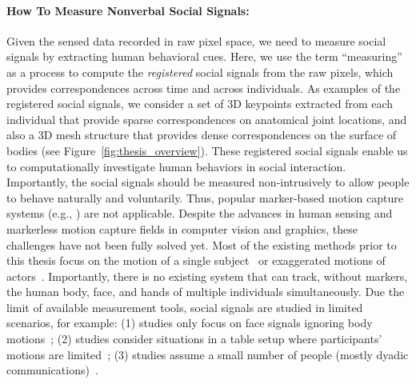 \paragraph{How To Measure Nonverbal Social Signals:}
Given the sensed data recorded in raw pixel space, we need to measure social signals by extracting human behavioral cues. Here, we use the term ``measuring'' as a process to compute the \emph{registered} social signals from the raw pixels, which provides correspondences across time and across individuals. As examples of the registered social signals, we consider a set of 3D keypoints extracted from each individual that provide sparse correspondences on anatomical joint locations, and also a 3D mesh structure that provides dense correspondences on the surface of bodies (see Figure~\ref{fig:thesis_overview}). These registered social signals enable us to computationally investigate human behaviors in social interaction. Importantly, the social signals should be measured non-intrusively to allow people to behave naturally and voluntarily. Thus, popular marker-based motion capture systems (e.g., \cite{VICON}) are not applicable. Despite the advances in human sensing and markerless motion capture fields in computer vision and graphics, these challenges have not been fully solved yet. Most of the existing methods prior to this thesis focus on the motion of a single subject~\cite{de2008performance,Vlasic-2009,Furukawa-2008,Gall-09, Stoll-11, Baak2011,Shotton-13} or exaggerated motions of actors~\cite{Ye-2012,Liu-2013}. Importantly, there is no existing system that can track, without markers, the human body, face, and hands of multiple individuals simultaneously. Due the limit of available measurement tools, social signals are studied in limited scenarios, for example: (1) studies only focus on face signals ignoring body motions~\cite{messinger2009automated, lucas_trust_2016,mckeown2012semaine}; (2) studies consider situations in a table setup where participants' motions are limited~\cite{carletta2005ami, Lepri-12,messinger2009automated, nojavanasghari2016emoreact, lucas_trust_2016,mckeown2012semaine}; (3) studies assume a small number of people (mostly dyadic communications)~\cite{messinger2009automated,nojavanasghari2016emoreact, lucas_trust_2016, katsimerou2016crowdsourcing,mckeown2012semaine,gunes2006bimodal}.



